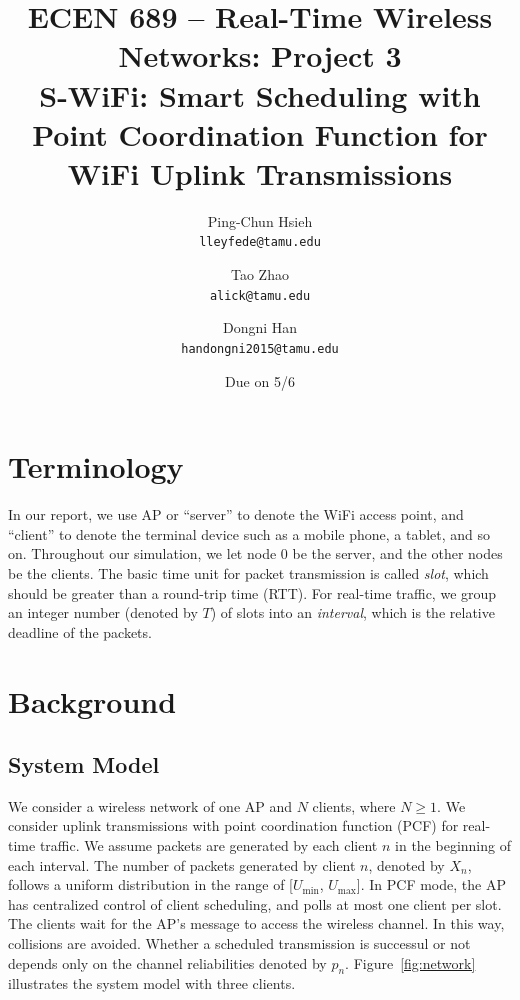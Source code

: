 \documentclass{article}
\begin{document}
\title{\bfseries ECEN 689 -- Real-Time Wireless Networks: Project 3\\
S-WiFi: Smart Scheduling with Point Coordination Function for WiFi Uplink Transmissions}
\date{Due on 5/6}
\author{%
Ping-Chun Hsieh\\
\texttt{lleyfede@tamu.edu}
\and
Tao Zhao\\
\texttt{alick@tamu.edu}
\and
Dongni Han\\
\texttt{handongni2015@tamu.edu}
}
\maketitle

\section*{Terminology}

In our report, we use AP or ``server'' to denote the WiFi access point, and ``client'' to denote the terminal device such as a mobile phone, a tablet, and so on. Throughout our simulation, we let node $0$ be the server, and the other nodes be the clients. The basic time unit for packet transmission is called \emph{slot}, which should be greater than a round-trip time (RTT). For real-time traffic, we group an integer number (denoted by $T$) of slots into an \emph{interval}, which is the relative deadline of the packets.

\section{Background}
\subsection{System Model}
We consider a wireless network of one AP and $N$ clients, where $N\ge1$. We consider uplink transmissions with point coordination function (PCF) for real-time traffic. We assume packets are generated by each client $n$ in the beginning of each interval. The number of packets generated by client $n$, denoted by $X_n$, follows a uniform distribution in the range of [$U_{\min}$, $U_{\max}$]. In PCF mode, the AP has centralized control of client scheduling, and polls at most one client per slot. The clients wait for the AP's message to access the wireless channel. In this way, collisions are avoided. Whether a scheduled transmission is successul or not depends only on the channel reliabilities denoted by $p_n$. Figure~\ref{fig:network} illustrates the system model with three clients.
\end{document}

